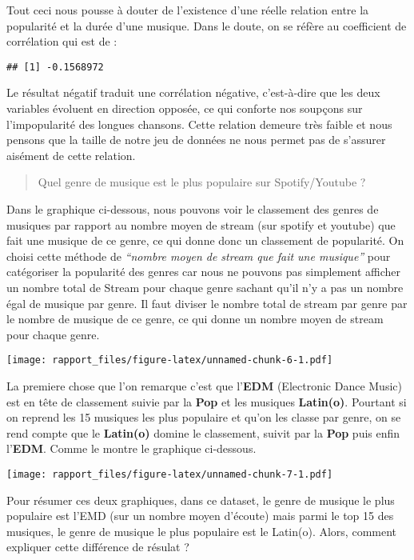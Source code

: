 \documentclass[
]{article}
\begin{document}
Tout ceci nous pousse à douter de l'existence d'une réelle relation
entre la popularité et la durée d'une musique. Dans le doute, on se
réfère au coefficient de corrélation qui est de :

\begin{verbatim}
## [1] -0.1568972
\end{verbatim}

Le résultat négatif traduit une corrélation négative, c'est-à-dire que
les deux variables évoluent en direction opposée, ce qui conforte nos
soupçons sur l'impopularité des longues chansons. Cette relation demeure
très faible et nous pensons que la taille de notre jeu de données ne
nous permet pas de s'assurer aisément de cette relation.

\begin{quote}
Quel genre de musique est le plus populaire sur Spotify/Youtube ?
\end{quote}

Dans le graphique ci-dessous, nous pouvons voir le classement des genres
de musiques par rapport au nombre moyen de stream (sur spotify et
youtube) que fait une musique de ce genre, ce qui donne donc un
classement de popularité. On choisi cette méthode de \emph{``nombre
moyen de stream que fait une musique''} pour catégoriser la popularité
des genres car nous ne pouvons pas simplement afficher un nombre total
de Stream pour chaque genre sachant qu'il n'y a pas un nombre égal de
musique par genre. Il faut diviser le nombre total de stream par genre
par le nombre de musique de ce genre, ce qui donne un nombre moyen de
stream pour chaque genre.

\texttt{[image: rapport\_files/figure-latex/unnamed-chunk-6-1.pdf]}

La premiere chose que l'on remarque c'est que l'\textbf{EDM} (Electronic
Dance Music) est en tête de classement suivie par la \textbf{Pop} et les
musiques \textbf{Latin(o)}. Pourtant si on reprend les 15 musiques les
plus populaire et qu'on les classe par genre, on se rend compte que le
\textbf{Latin(o)} domine le classement, suivit par la \textbf{Pop} puis
enfin l'\textbf{EDM}. Comme le montre le graphique ci-dessous.

\texttt{[image: rapport\_files/figure-latex/unnamed-chunk-7-1.pdf]}

Pour résumer ces deux graphiques, dans ce dataset, le genre de musique
le plus populaire est l'EMD (sur un nombre moyen d'écoute) mais parmi le
top 15 des musiques, le genre de musique le plus populaire est le
Latin(o). Alors, comment expliquer cette différence de résulat ?
\end{document}
